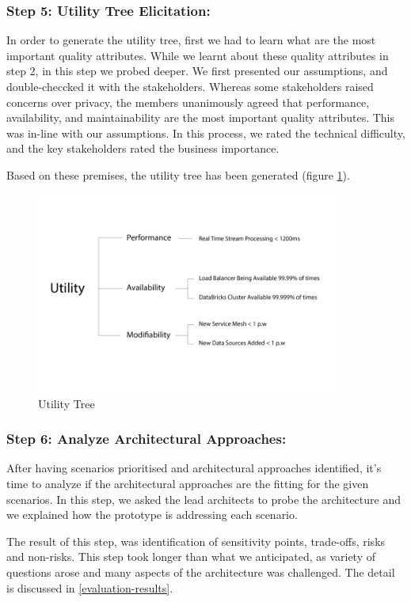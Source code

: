 \documentclass[review]{elsarticle}
\begin{document}
\subsubsection{Step 5: Utility Tree Elicitation:}
In order to generate the utility tree, first we had to learn what are the most important quality attributes. While we learnt about these quality attributes in step 2, in this step we probed deeper. We first presented our assumptions, and double-checcked it with the stakeholders. Whereas some stakeholders raised concerns over privacy, the members unanimously agreed that performance, availability, and maintainability are the most important quality attributes. This was in-line with our assumptions. In this process, we rated the technical difficulty, and the key stakeholders rated the business importance.

Based on these premises, the utility tree has been generated (figure \ref{fig:utility-tree}).

\begin{figure}[h!]
    \centering
    \includegraphics[width=10cm]{Media/Utility-tree.jpg}
    \caption{Utility Tree}
    \label{fig:utility-tree}
\end{figure}

\subsubsection{Step 6: Analyze Architectural Approaches:}

After having scenarios prioritised and architectural approaches identified, it's time to analyze if the architectural approaches are the fitting for the given scenarios. In this step, we asked the lead architects to probe the architecture and we explained how the prototype is addressing each scenario. 

The result of this step, was identification of sensitivity points, trade-offs, risks and non-risks. This step took longer than what we anticipated, as variety of questions arose and many aspects of the architecture was challenged. The detail is discussed in \ref{evaluation-results}. 
 
\end{document}
